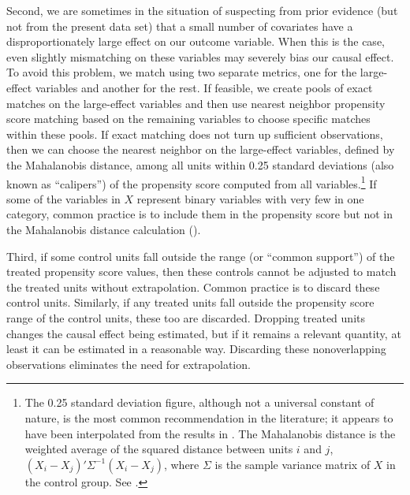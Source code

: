 \documentclass[11pt,titlepage]{article}
\begin{document}
Second, we are sometimes in the situation of suspecting from prior
evidence (but not from the present data set) that a small number of
covariates have a disproportionately large effect on our outcome
variable.  When this is the case, even slightly mismatching on these
variables may severely bias our causal effect.  To avoid this problem,
we match using two separate metrics, one for the large-effect
variables and another for the rest.  If feasible, we create pools of
exact matches on the large-effect variables and then use nearest
neighbor propensity score matching based on the remaining variables to
choose specific matches within these pools.  If exact matching does
not turn up sufficient observations, then we can choose the nearest
neighbor on the large-effect variables, defined by the Mahalanobis
distance, among all units within 0.25 standard deviations (also known
as ``calipers'') of the propensity score computed from all
variables.\footnote{The 0.25 standard deviation figure, although not a
  universal constant of nature, is the most common recommendation in
  the literature; it appears to have been interpolated from the
  results in \citet{CocRub73}.  The Mahalanobis distance is the
  weighted average of the squared distance between units $i$ and $j$,
  $(X_i-X_j)'\Sigma^{-1}(X_i-X_j)$, where $\Sigma$ is the sample
  variance matrix of $X$ in the control group.  See \cite{RubTho00}.}
If some of the variables in $X$ represent binary variables with very
few in one category, common practice is to include them in the
propensity score but not in the Mahalanobis distance calculation
(\citealp{GuRos93, RubTho00}).

Third, if some control units fall outside the range (or ``common
support'') of the treated propensity score values, then these controls
cannot be adjusted to match the treated units without extrapolation.
Common practice is to discard these control units.  Similarly, if any
treated units fall outside the propensity score range of the control
units, these too are discarded.  Dropping treated units changes the
causal effect being estimated, but if it remains a relevant quantity,
at least it can be estimated in a reasonable way.  Discarding these
nonoverlapping observations eliminates the need for extrapolation.
\end{document}
